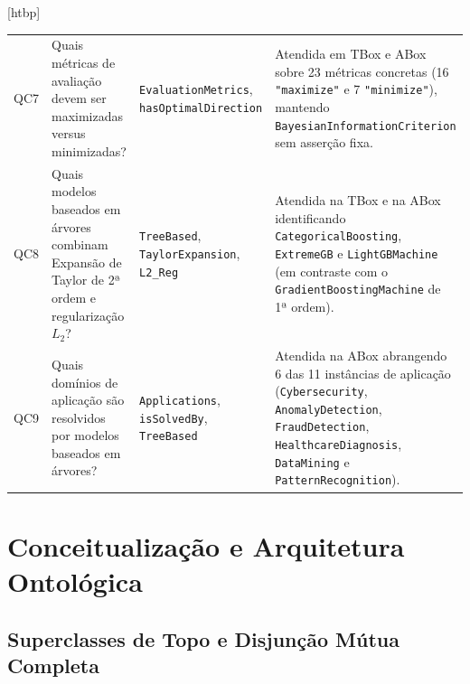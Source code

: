 \documentclass[11pt,a4paper]{article}
\makeatletter
\newcommand{\onto}[1]{\texttt{#1}}
\newcounter{quadro}
\newenvironment{quadro}{\@float{quadro}}{\end@float}
\makeatother
\begin{document}
\begin{quadro}[htbp]
\begin{tabularx}{\textwidth}{@{}p{0.8cm}>{\raggedright\arraybackslash}p{4.6cm}>{\raggedright\arraybackslash}p{4.5cm}>{\raggedright\arraybackslash}X@{}}
\addlinespace[4pt]
QC7 & Quais métricas de avaliação devem ser maximizadas versus minimizadas? & \onto{EvaluationMetrics}, \onto{hasOptimalDirection} & Atendida em TBox e ABox sobre 23 métricas concretas (16 \onto{"maximize"} e 7 \onto{"minimize"}), mantendo \onto{BayesianInformationCriterion} sem asserção fixa. \\
\addlinespace[4pt]
QC8 & Quais modelos baseados em árvores combinam Expansão de Taylor de 2ª ordem e regularização $L_2$? & \onto{TreeBased}, \onto{TaylorExpansion}, \onto{L2\_Reg} & Atendida na TBox e na ABox identificando \onto{CategoricalBoosting}, \onto{ExtremeGB} e \onto{LightGBMachine}~\cite{bentejac2021comparative} (em contraste com o \onto{GradientBoostingMachine} de 1ª ordem). \\
\addlinespace[4pt]
QC9 & Quais domínios de aplicação são resolvidos por modelos baseados em árvores? & \onto{Applications}, \onto{isSolvedBy}, \onto{TreeBased} & Atendida na ABox abrangendo 6 das 11 instâncias de aplicação (\onto{Cybersecurity}, \onto{AnomalyDetection}, \onto{FraudDetection}, \onto{HealthcareDiagnosis}, \onto{DataMining} e \onto{PatternRecognition}). \\
\bottomrule
\end{tabularx}
\end{quadro}

\section{Conceitualização e Arquitetura Ontológica}\label{sec:arq}

\subsection{Superclasses de Topo e Disjunção Mútua Completa}
\end{document}
